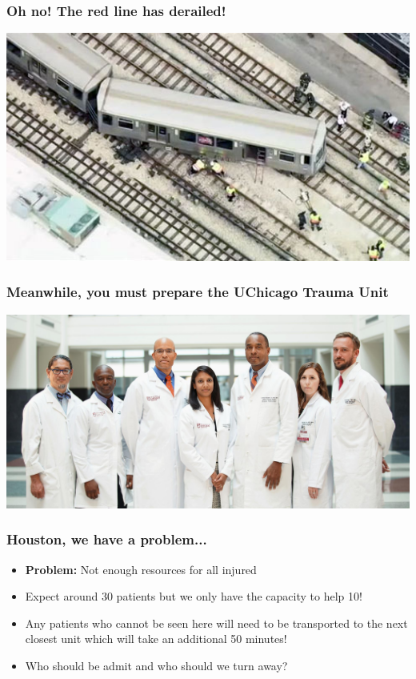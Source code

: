 \documentclass{beamer}
\begin{document}
\begin{frame}
  \frametitle{Oh no! The red line has derailed!}
  \includegraphics[width=1\textwidth]{train_derailed}
\end{frame}


\begin{frame}
  \frametitle{Meanwhile, you must prepare the UChicago Trauma Unit}
  \includegraphics[width=1\textwidth]{uchicago_trama}
\end{frame}

\begin{frame}
  \frametitle{Houston, we have a problem...}
  \begin{itemize}
    \item \textbf{Problem:} Not enough resources for all injured
    \item Expect around 30 patients but we only have the capacity to help 10!\pause
    \item Any patients who cannot be seen here will need to be transported to the next closest unit which will take an additional 50 minutes!\pause
    \item Who should be admit and who should we turn away?
  \end{itemize}
\end{frame}
\end{document}
